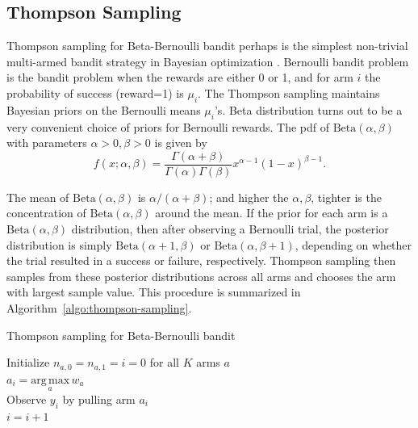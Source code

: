 \documentclass{article}
\begin{document}
\subsection{Thompson Sampling}
Thompson sampling for Beta-Bernoulli bandit perhaps is the simplest non-trivial multi-armed
bandit strategy in Bayesian optimization \cite{Shahriari2016-ho}. Bernoulli bandit problem is
the bandit problem when the rewards are either 0 or 1, and for arm $i$
the probability of success (reward=1) is $\mu_i$. The Thompson
sampling maintains Bayesian priors on the Bernoulli means
$\mu_i$'s. Beta distribution turns out to be a very convenient choice
of priors for Bernoulli rewards. The pdf of $\mathrm{Beta}(\alpha,
\beta)$ with parameters $\alpha > 0, \beta > 0$ is given by
\begin{equation}
  f(x;\alpha, \beta) = \frac{\Gamma(\alpha + \beta)}{\Gamma(\alpha)\Gamma(\beta)}x^{\alpha-1}(1-x)^{\beta-1}.
\end{equation}

The mean of $\mathrm{Beta}(\alpha,\beta)$ is $\alpha / (\alpha +
\beta)$; and higher the $\alpha, \beta$, tighter is the concentration
of $\mathrm{Beta}(\alpha,\beta)$ around the mean. If the prior
for each arm is a $\mathrm{Beta}(\alpha,\beta)$ distribution, then
after observing a Bernoulli trial, the posterior distribution is
simply $\mathrm{Beta}(\alpha + 1,\beta)$ or
$\mathrm{Beta}(\alpha,\beta +1)$, depending on whether the trial
resulted in a success or failure, respectively. Thompson sampling then
samples from these posterior distributions across all arms and chooses
the arm with largest sample value. This procedure is summarized in
Algorithm~\ref{algo:thompson-sampling}.

\begin{algorithm}[h] \label{algo:thompson-sampling}

  \caption{Thompson sampling for Beta-Bernoulli bandit}
  Initialize $n_{a,0}=n_{a,1}=i=0$ for all $K$ arms $a$ \\
   {
    $a_i = \underset{a}{\mathrm{arg\, max}}\, w_a$ \\
    Observe $y_i$ by pulling arm $a_i$ \\
    $i = i + 1$ \\
 }
\end{algorithm}
\end{document}

